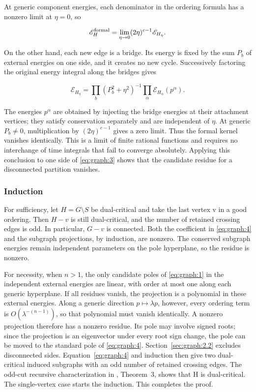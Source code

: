\documentclass[11pt,a4paper,oneside]{article}
\theoremstyle{plain}
\theoremstyle{definition}
\theoremstyle{remark}
\numberwithin{equation}{section}
\begin{document}
At generic component energies, each denominator in the ordering formula has a nonzero limit at \(\eta=0\), so

\begin{equation}
\mathscr E_H^{\rm formal}
 =\lim_{\eta\to0}(2\eta)^{c-1}\mathscr E_{H_\eta}.          \label{eq:graph:5}
\end{equation}

On the other hand, each new edge is a bridge. Its energy is fixed by the sum \(P_b\) of external energies on one side, and it creates no new cycle. Successively factoring the original energy integral along the bridges gives

\begin{equation}
\mathscr E_{H_\eta}
 =\prod_b(P_b^2+\eta^2)^{-1}
   \prod_\alpha\mathscr E_{H_\alpha}(p^\alpha).
\end{equation}

The energies \(p^\alpha\) are obtained by injecting the bridge energies at their attachment vertices; they satisfy conservation separately and are independent of \(\eta\). At generic \(P_b\ne0\), multiplication by \((2\eta)^{c-1}\) gives a zero limit. Thus the formal kernel vanishes identically. This is a limit of finite rational functions and requires no interchange of time integrals that fail to converge absolutely. Applying this conclusion to one side of \eqref{eq:graph:3} shows that the candidate residue for a disconnected partition vanishes.

\subsubsection{Induction}\label{sec:graph:2.3}

For sufficiency, let \(H=G\setminus S\) be dual-critical and take the last vertex v in a good ordering. Then \(H-v\) is still dual-critical, and the number of retained crossing edges is odd. In particular, \(G-v\) is connected. Both the coefficient in \eqref{eq:graph:4} and the subgraph projections, by induction, are nonzero. The conserved subgraph energies remain independent parameters on the pole hyperplane, so the residue is nonzero.

For necessity, when \(n>1\), the only candidate poles of \eqref{eq:graph:1} in the independent external energies are linear, with order at most one along each generic hyperplane. If all residues vanish, the projection is a polynomial in these external energies. Along a generic direction \(p\mapsto\lambda p\), however, every ordering term is \(O(\lambda^{-(n-1)})\), so that polynomial must vanish identically. A nonzero projection therefore has a nonzero residue. Its pole may involve signed roots; since the projection is an eigenvector under every root sign change, the pole can be moved to the standard pole of \eqref{eq:graph:4}. Section~\ref{sec:graph:2.2} excludes disconnected sides. Equation~\eqref{eq:graph:4} and induction then give two dual-critical induced subgraphs with an odd number of retained crossing edges. The odd-cut recursive characterization in \cite{dualcritical}, Theorem~3, shows that H is dual-critical. The single-vertex case starts the induction. This completes the proof.
\end{document}

